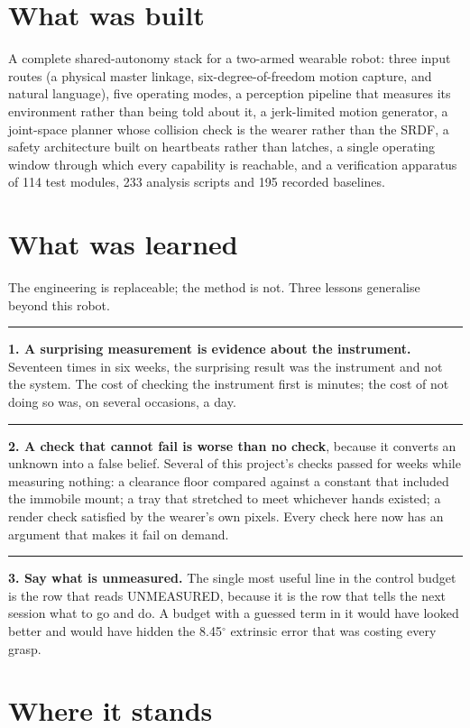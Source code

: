 \documentclass[11pt,a4paper,oneside]{report}
\newcommand{\dg}{$^{\circ}$}
\newcommand{\keyfact}[1]{%
  \par\vspace{7pt}\noindent
  \hspace*{0pt}\textcolor{srlblue}{\rule{2.5pt}{\dimexpr\baselineskip\relax}}%
  \hspace{9pt}%
  \begin{minipage}[t]{\dimexpr\textwidth-14pt\relax}
  \small #1
  \end{minipage}\par\vspace{7pt}}
\begin{document}
\section{What was built}

A complete shared-autonomy stack for a two-armed wearable robot: three input
routes (a physical master linkage, six-degree-of-freedom motion capture, and
natural language), five operating modes, a perception pipeline that measures
its environment rather than being told about it, a jerk-limited motion
generator, a joint-space planner whose collision check is the wearer rather
than the SRDF, a safety architecture built on heartbeats rather than latches, a
single operating window through which every capability is reachable, and a
verification apparatus of 114 test modules, 233 analysis scripts and 195
recorded baselines.

\section{What was learned}

The engineering is replaceable; the method is not. Three lessons generalise
beyond this robot.

\keyfact{\textbf{1. A surprising measurement is evidence about the instrument.}
Seventeen times in six weeks, the surprising result was the instrument and not
the system. The cost of checking the instrument first is minutes; the cost of
not doing so was, on several occasions, a day.}

\keyfact{\textbf{2. A check that cannot fail is worse than no check}, because
it converts an unknown into a false belief. Several of this project's checks
passed for weeks while measuring nothing: a clearance floor compared against a
constant that included the immobile mount; a tray that stretched to meet
whichever hands existed; a render check satisfied by the wearer's own pixels.
Every check here now has an argument that makes it fail on demand.}

\keyfact{\textbf{3. Say what is unmeasured.} The single most useful line in the
control budget is the row that reads UNMEASURED, because it is the row that
tells the next session what to go and do. A budget with a guessed term in it
would have looked better and would have hidden the 8.45\dg{} extrinsic error
that was costing every grasp.}

\section{Where it stands}
\end{document}
